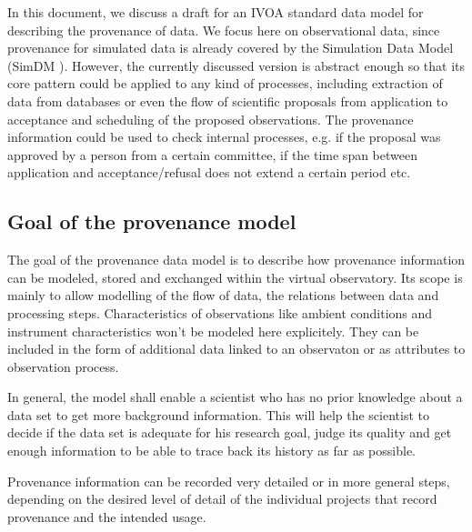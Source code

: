 In this document, we discuss a draft for an IVOA standard data model for describing the
provenance of data. We focus here on observational data, since provenance for
simulated data is already covered by the Simulation Data Model (SimDM 
\citep{std:SimDM}). However, the currently discussed version is abstract enough so that 
its core pattern could be applied to any kind of processes, including extraction of data from 
databases or even the flow of scientific proposals from application to 
acceptance and scheduling of the proposed observations. The provenance information 
could be used to check internal processes, e.g. if the proposal was approved by 
a person from a certain committee, if the time span between application and 
acceptance/refusal does not extend a certain period etc. 


\subsection{Goal of the provenance model}\label{sec:goals}
The goal of the provenance data model is to describe how provenance information 
can be modeled, stored and exchanged within the virtual observatory. Its scope 
is mainly to allow modelling of the flow of data, the relations between data 
and processing steps. Characteristics of observations like ambient conditions 
and instrument characteristics won't be modeled here explicitely. They can be 
included in the form of additional data linked to an observaton or as 
attributes to observation process.

In general, the model shall enable a scientist who has no prior knowledge about 
a data set to get more 
background information. This will help the scientist to decide if the data set 
is adequate for his research goal, judge its quality and get enough information 
to be able to trace back its history as far as possible. 

Provenance information can be recorded very detailed or in more general steps, 
depending on the desired level of detail of the individual projects that record 
provenance and the intended usage.



